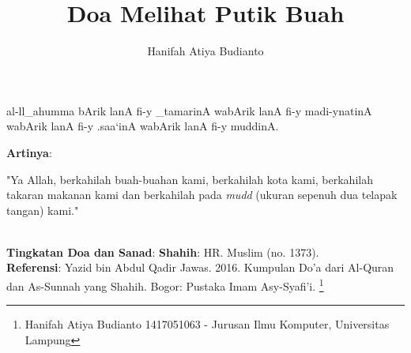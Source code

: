 \documentclass[a4paper,12pt]{article}
\title{\Large Doa Melihat Putik Buah}
\author{\calligra Hanifah Atiya Budianto}
\begin{document}
\sffamily
\maketitle 
\fullvocalize
{}
\begin{arabtext}
\noindent
al-ll_ahumma bArik lanA fi-y _tamarinA wabArik lanA fi-y madi-ynatinA 
wabArik lanA fi-y .saa`inA wabArik lanA fi-y muddinA.\\
\end{arabtext}
\noindent
\textbf{Artinya}:
\par
\indent
"Ya Allah, berkahilah buah-buahan kami, berkahilah kota kami, berkahilah 
takaran makanan kami dan berkahilah pada \textit{mudd} (ukuran sepenuh dua 
telapak tangan) kami."\\\\
\par
\noindent
\textbf{Tingkatan Doa dan Sanad}: \textbf{Shahih}: HR. Muslim (no. 1373).\\
\textbf{Referensi}: Yazid bin Abdul Qadir Jawas. 2016. Kumpulan Do'a dari
Al-Quran dan As-Sunnah yang Shahih. Bogor: Pustaka Imam Asy-Syafi'i.
\footnote{Hanifah Atiya Budianto 1417051063 - Jurusan Ilmu Komputer,
Universitas Lampung}
\end{document}
